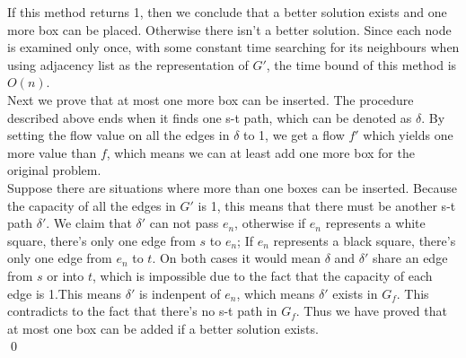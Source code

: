 \documentclass[10pt]{article}
\begin{document}
If this method returns 1, then we conclude that a better solution exists and one more box can be placed. Otherwise there isn't a better solution. Since each node is examined only once, with some constant time searching for its neighbours when using adjacency list as the representation of $G'$, the time bound of this method is $O(n)$.\\
{\color{red}
Next we prove that at most one more box can be inserted. The procedure described above ends when it finds one s-t path, which can be denoted as $\delta$. By setting the flow value on all the edges in $\delta$ to 1, we get a flow $f'$ which yields one more value than $f$, which means we can at least add one more box for the original problem. \\
Suppose there are situations where more than one boxes can be inserted. Because the capacity of all the edges in $G'$ is 1, this means that there must be another s-t path $\delta'$. We claim that $\delta'$ can not pass $e_n$, otherwise if $e_n$ represents a white square, there's only one edge from $s$ to $e_n$; If $e_n$ represents a black square, there's only one edge from $e_n$ to $t$. On both cases it would mean $\delta$ and $\delta'$ share an edge from $s$ or into $t$, which is impossible due to the fact that the capacity of each edge is 1.This means $\delta'$ is indenpent of $e_n$, which means $\delta'$ exists in $G_f$. This contradicts to the fact that there's no s-t path in $G_f$. Thus we have proved that at most one box can be added if a better solution exists.\\
}
\qed
\end{document}
